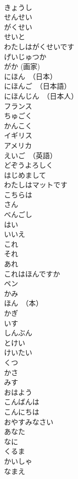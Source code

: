 \documentclass[8pt]{extreport}
\begin{document}
\begin{CJK}{UTF8}{min}
\\	きょうし	
\\	せんせい	
\\	がくせい	
\\	せいと	
\\	わたしはがくせいです	
\\	げいじゅつか	
\\	がか (画家)	
\\	にほん　（日本）	
\\	にほんご　（日本語）	
\\	にほんじん　（日本人）	
\\	フランス	
\\	ちゅごく	
\\	かんこく	
\\	イギリス	
\\	アメリカ	
\\	えいご　（英語）	
\\	どぞうよろしく	
\\	はじめまして	
\\	わたしはマットです	
\\	こちらは	
\\	さん	
\\	べんごし	
\\	はい	
\\	いいえ	
\\	これ	
\\	それ	
\\	あれ	
\\	これはほんですか	
\\	ペン	
\\	かみ	
\\	ほん　（本）	
\\	かぎ	
\\	いす	
\\	しんぶん	
\\	とけい	
\\	けいたい	
\\	くつ	
\\	かさ	
\\	みす	
\\	おはよう	
\\	こんばんは	
\\	こんにちは	
\\	おやすみなさい	
\\	あなた	
\\	なに	
\\	くるま	
\\	かいしゃ	
\\	なまえ	

\end{CJK}
\end{document}
